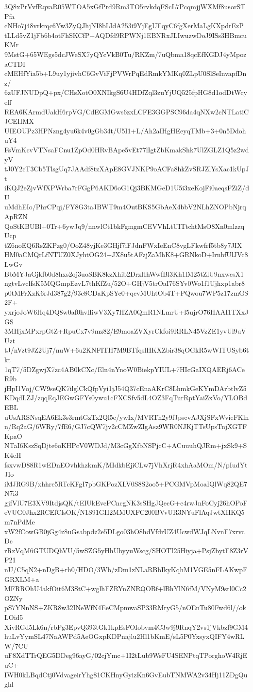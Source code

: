 3Q8xPrVvfRqvaR05WTOA5xGfPrd9Rm3TO5rvkdqFScL7PcqmjjWXMf8usorSTPfa
cNHo7j48vrkrqc6Yw3ZyQJhjNI8bLIdA253i9YjEgUFqyC6fgXerMaLgKXpdrEzP
tLLd5vZ1jFb6b4otFhSKCfP+AQDfd9RPWNj1EBNRxJLIwuzwDoJ9ISs3HBmcuKMr
9MstG+65WEgs5dcJWeSX7yQYcVkB0Tu/RKZm/7uQbma18qcEfKGDJ4yMpozaCTDI
cMEHfYia5b+L9uy1yjivhC6GvViFjPVWrPqEdRmkYMKq0ZLpU0SlSeInvapfDnz/
6zUFJNUDpQ+px/CHsXotO0XNIkgS6U4HDfZql3zuYjUQ525fpHG8d1odDtWcyeff
REA6KArmdUakH6rpVG/CdEGMGws6zxLCFE3GGPSC96da4qNXw2cNTLatiCJCEHMX
UIEOUPz3HPNzng4yu6k4v0gGb34t/U5I1+L/Ah2aIHgHEeyqTMb+3+0n5DdohuY4
FsVmKcvVTNsaFCnu1ZpOd0HRvBApe5vEt77lIgtZbKmakShk7UlZGLZ1Q5z2wdyV
tJ0Y2cT3Cb5TlsgUq7JAAdf8tzXApE8GVJNKP9oACFa8hkZvSRJZlYsXac1kUpJt
iKQJ2eZjvWfXPWrba7rFGgP6AKD6oG1Qj3BKMGeD1U5i3xeKojFi0aeqsFZiZ/dU
uMdhEIo/PhrCPqj/FY8G3taJBWT9m4OutBKS5GbAeX4bbV2NLhZNOPbNjrqApRZN
QoStKBUBl+0Tr+6ywJq9/nnwlCt1bkFgmgmCEVVhLtUITtchtMsO8Xn0mlzzqUcp
tZ6noEQ6RsZKPzg0/OoZ48yjKe3GHjf7iFJdnFWxIeEnC8vgLFkwfrf5tb8y7JIX
HM0aCMQrLfNTUZ0XJyhtOG24+JX8u5tAFzjZaMhK8+GRNkoD+IrnbfUlJVc8LwGv
BbMYJaGjkfb0d8hxs2oj3uoSBK8kzXhib2DrzHhWwfBl3Kh1lM25tZlU9nxwcsX1
ngtvLvclfsK5MQGmpEzvL7thKfZu/52O+GHjV5trOaI76SYv0Wo1f1Ujhxp1abr8
p0tMFrXzK6rJd387g2/93c8CDaKpSYc0+qcvMUhtOb4T+PQwou7WP5z17zmGS2F+
yxrjoJoW6Hq4DQ8w0af0hvlIiwV3Xy7HZA0QmR1NLmrU+l5ujrO76HAAI1TXxJGS
3MHjxMPxrpGtZ+RpuCx7v9mz82/E9moaZVXyrCkfoi9RRLN45VzZE1yvUl9uVUzt
tJ/nVzt9JZ2Uj7/nuW+6u2KNFITH7M9BTfqslHKXZbir38qOGkR5wWITUSyb6tkt
1qT7/5DZgwjX7zc4AB0kCXc/Eln4nYnoW0BiekpYIUL+7HIcGaIXQAERj6ACeR9b
jHpI1Voj/CW9seQK7ilglCkQfpVyi1jJ54Q37cEnaAKrC8LhmkGeKYmDArbtlvZ5
KDqdLZJ/zqqEqJEGwGFYs0ywu1cFXCSfv5dL4OZ3FqTurRptYaiZxVo/YLOBdEBL
uUsARSNsqEA6Ek3s3rmtGzTx2Ql5e/ywIx/MVRTh2y9fJpsevAJXjSFxWvieFKln
n/Rq2aG/6WRy/7fE6/GJ7cQW7jv2cCMZwZIgAsz9WR0NJKjTTsUpsTnjXGTFKpaO
NTaI6KszSqDjte6oKHPcV0WDJd/M3cGgXfbNSPjcC+ACuuuhQJRm+jxSk9+SK4eH
fsxvwD88R1wEDnEOvhkhzkmK/MIdkbEjiCLw7jVhXrjR4xhAaMOm/N/pIudYtJIo
iMJRG9B/xhhre5RTcKFgI7pbGKPozXLV0S8S2oo5+PCGMVpMoaIQlWq82QE7N7i3
gjfVlU7E3XV9ItdjsQK/tEIUkEvcPCncgNK3sSHgJQecG+e4rwJnFoCyj26hOPoF
eVUG0Jhx2RCEfClsOK/N1S91GH2MMUXFC200BVvUR3NYuFlAqJwtXHKQ5m7nPdMe
xW2fCowGB0jGg4z8uGsabpdz2e5DLgo03hO8hdVfdrUZ4UcwdWJqLNvnF7xrvcDc
rRzVqM6GTUDQhVU/5wSZG5yHhUbyyuWscg/SHOTI25Hiyja+PsjZbytF8Z3rVP21
nU/C5qN2+nDgB+rh0/HDO/3Wb/zDm1zNLaRBbIkyKqhM1VGE5nFLAKwpFGRXLM+a
MFRROhU4akfOit6M3StC+wglhFZRYnZNRQOBf+lBhYlN6fM/VNyM9stl0Cc2OZNy
pS7YNnNS+ZKR8w32INeWfN4EeCMpmwaSP33RMryG5/nOEnTu80Fwd6l//okLOid5
XivRGd5Lk6n/rbPg3EpvQ393tGk1kpEsFOIobvm4C3w9j9RnqY2vs1jVkbzf9GM4
huLvYymSL47NaAWPd5AeOGxpKDPnajlu2Hl1bKmE/sL5P0YxsyxQIFY4wRLW/7CU
uF8XdTTrQEG5DDeg96ayG/02cjYmc+1I2tLub9WsFU4SENPtqTPorghoW4RjEuC+
IWH0kLBqdCtj0VdvageirYhg81CKHnyGyizKn6GvEubTNMWA2v34Hj11ZDgQughl

